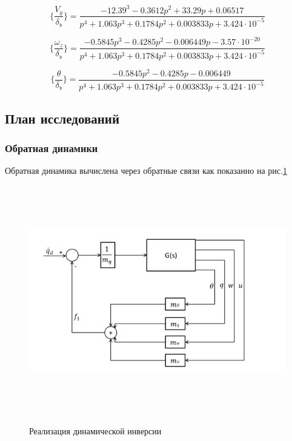 \begin{equation}
    \label{eq:ПФ по вертикальной скорости СПС}
    \{ \frac{V_y}{\delta_\text{э}} \} = \frac{-12.39^3 - 0.3612p^2 + 33.29p + 0.06517}{p^4 + 1.063p^3 + 0.1784p^2 + 0.003833p + 3.424 \cdot 10^{-5}}
\end{equation}

\begin{equation}
    \label{eq:ПФ по угловой скорости тангажа СПС}
    \{ \frac{\omega_z}{\delta_\text{э}} \} = \frac{-0.5845p^3 - 0.4285p^2 - 0.006449p - 3.57 \cdot 10^{-20}}{p^4 + 1.063p^3 + 0.1784p^2 + 0.003833p + 3.424 \cdot 10^{-5}}
\end{equation}

\begin{equation}
    \label{eq:ПФ по углу наклона траектории}
    \{ \frac{\theta}{\delta_\text{э}} \} = \frac{-0.5845p^2 - 0.4285p - 0.006449}{p^4 + 1.063p^3 + 0.1784p^2 + 0.003833p + 3.424 \cdot 10^{-5}}
\end{equation}

\subsection{План исследований}
\subsubsection{Обратная динамики }
Обратная динамика вычислена через обратные связи как показанно на рис.\ref{fig:САУ_ОД}
\begin{figure}[H]
    \centering \includegraphics[width=15cm,height=10cm]{Оглавление/Part3/figures/САУ_ОД.png}
    \caption{Реализация динамической инверсии}
    {\label{fig:САУ_ОД}}
    \end{figure}
